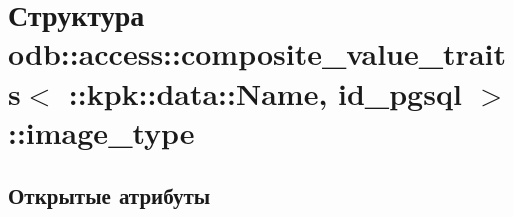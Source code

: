 \hypertarget{structodb_1_1access_1_1composite__value__traits_3_01_1_1kpk_1_1data_1_1_name_00_01id__pgsql_01_4_1_1image__type}{}\section{Структура odb\+:\+:access\+:\+:composite\+\_\+value\+\_\+traits$<$ \+:\+:kpk\+:\+:data\+:\+:Name, id\+\_\+pgsql $>$\+:\+:image\+\_\+type}
\label{structodb_1_1access_1_1composite__value__traits_3_01_1_1kpk_1_1data_1_1_name_00_01id__pgsql_01_4_1_1image__type}
\subsection*{Открытые атрибуты}
